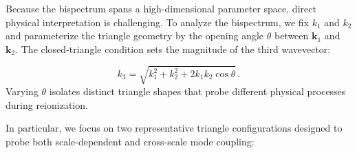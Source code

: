 \documentclass[apj,twocolumn, appendixfloats, twocolappendix, numberedappendix, tighten]{openjournal}
\begin{document}
Because the bispectrum spans a high-dimensional parameter space, direct physical interpretation is challenging. To analyze the bispectrum, we fix $k_1$ and $k_2$ and parameterize the triangle geometry by the opening angle $\theta$ between $\mathbf{k}_1$ and $\mathbf{k}_2$. The closed-triangle condition sets the magnitude of the third wavevector:

\begin{equation}
    k_3 = \sqrt{k_1^2 + k_2^2 + 2k_1k_2\cos\theta} \, .
\end{equation}
Varying $\theta$ isolates distinct triangle shapes that probe different physical processes during reionization.

In particular, we focus on two representative triangle configurations designed to probe both scale-dependent and cross-scale mode coupling:
\end{document}
